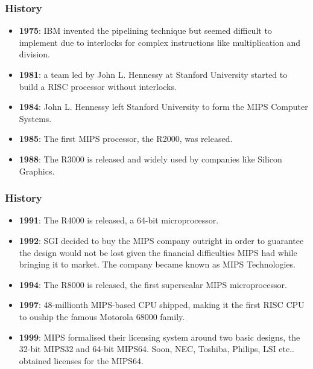 
\begin{frame}
  \frametitle{History}

  \begin{itemize}[<+->]
    \item
      \textbf{1975}: IBM invented the pipelining technique but seemed
      difficult to implement due to interlocks for complex instructions like
      multiplication and division.
    \item
      \textbf{1981}: a team led by John L. Hennessy at Stanford University
      started to build a RISC processor without interlocks.
    \item
      \textbf{1984}: John L. Hennessy left Stanford University to form
      the MIPS Computer Systems.
    \item
      \textbf{1985}: The first MIPS processor, the R2000, was released.
    \item
      \textbf{1988}: The R3000 is released and widely used by companies like
      Silicon Graphics.
  \end{itemize}
\end{frame}


\begin{frame}
  \frametitle{History}

  \begin{itemize}[<+->]
    \item
      \textbf{1991}: The R4000 is released, a 64-bit microprocessor.
    \item
      \textbf{1992}: SGI decided to buy the MIPS company outright in order
      to guarantee the design would not be lost given the financial
      difficulties MIPS had while bringing it to market. The company became
      known as MIPS Technologies.
    \item
      \textbf{1994}: The R8000 is released, the first superscalar
      MIPS microprocessor.
    \item
      \textbf{1997}: 48-millionth MIPS-based CPU shipped, making it the
      first RISC CPU to ouship the famous Motorola 68000 family.
    \item
      \textbf{1999}: MIPS formalised their licensing system around two
      basic designs, the 32-bit MIPS32 and 64-bit MIPS64. Soon, NEC, Toshiba,
      Philips, LSI etc.. obtained licenses for the MIPS64.
  \end{itemize}
\end{frame}


